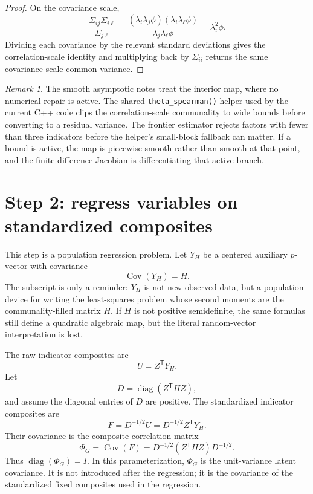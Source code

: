 \documentclass[11pt]{article}
\newcommand{\T}{^{\mathsf T}}
\newcommand{\Cov}{\operatorname{Cov}}
\newcommand{\diag}{\operatorname{diag}}
\theoremstyle{plain}
\theoremstyle{remark}
\newtheorem*{remark}{Remark}
\begin{document}
\begin{proof}
On the covariance scale,
\[
  \frac{\Sigma_{ij}\Sigma_{i\ell}}{\Sigma_{j\ell}}
  =
  \frac{(\lambda_i\lambda_j\phi)(\lambda_i\lambda_\ell\phi)}
       {\lambda_j\lambda_\ell\phi}
  =
  \lambda_i^2\phi .
\]
Dividing each covariance by the relevant standard deviations gives the
correlation-scale identity and multiplying back by \(\Sigma_{ii}\) returns the
same covariance-scale common variance.
\end{proof}

\begin{remark}
The smooth asymptotic notes treat the interior map, where no numerical repair is
active. The shared \texttt{theta\_spearman()} helper used by the current C++
code clips the correlation-scale communality to wide bounds before converting
to a residual variance. The frontier estimator rejects factors with fewer than
three indicators before the helper's small-block fallback can matter. If a
bound is active, the map is piecewise smooth rather than smooth at that point,
and the finite-difference Jacobian is differentiating that active branch.
\end{remark}

\section{Step 2: regress variables on standardized composites}

This step is a population regression problem. Let \(Y_H\) be a centered
auxiliary \(p\)-vector with covariance
\[
  \Cov(Y_H)=H .
\]
The subscript is only a reminder: \(Y_H\) is not new observed data, but a
population device for writing the least-squares problem whose second moments
are the communality-filled matrix \(H\). If \(H\) is not positive semidefinite,
the same formulas still define a quadratic algebraic map, but the literal
random-vector interpretation is lost.

The raw indicator composites are
\[
  U=Z\T Y_H .
\]
Let
\[
  D=\diag(Z\T HZ),
\]
and assume the diagonal entries of \(D\) are positive. The standardized
indicator composites are
\[
  F=D^{-1/2}U=D^{-1/2}Z\T Y_H .
\]
Their covariance is the composite correlation matrix
\begin{equation}\label{eq:PhiG}
  \Phi_G
  =
  \Cov(F)
  =
  D^{-1/2}(Z\T HZ)D^{-1/2}.
\end{equation}
Thus \(\diag(\Phi_G)=I\). In this parameterization, \(\Phi_G\) is the
unit-variance latent covariance. It is not introduced after the regression; it
is the covariance of the standardized fixed composites used in the regression.
\end{document}
